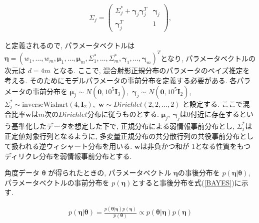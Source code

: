 \documentclass[a4j,11pt]{jarticle}
\begin{document}
\vspace{-2zh}
\begin{eqnarray}
\label{SIGMA}
 \Sigma_j = \left(
    \begin{array}{cc}
      \Sigma^*_j + \bm \gamma_j \bm \gamma_j^T & \bm \gamma_j \\
      \bm \gamma_j^T & 1
    \end{array}
  \right),
\end{eqnarray}

\vspace{-0.5zh}
\noindent
と定義されるので, パラメータベクトルは$\bm \eta = (w_1, \dots, w_m, \bm \mu_1, \dots, \bm \mu_m, \Sigma^*_1, \dots, \Sigma^*_m, \bm \gamma_1, \dots, \bm \gamma_m)^T$となり, パラメータベクトルの次元は $d = 4m$ となる. ここで, 混合射影正規分布のパラメータのベイズ推定を考える. そのためにモデルパラメータの事前分布を定義する必要がある. 各パラメータの事前分布を $\bm \mu_j \sim N(\bm 0, 10^5 \bm I_3)$,\ $\bm \gamma_j \sim  N(\bm 0, 10^5 \bm I_2)$,\ $\Sigma^*_j \sim \mathrm{inverse Wishart}(4,\bm I_2)$,\ $\bm w \sim Dirichlet(2,2, \dots, 2)$ と設定する. ここで混合比率$\bm w$は$m$次の$Dirichlet$分布に従うものとする. $\bm \mu_j,\ \bm \gamma_j$は$0$付近に存在するという基準化したデータを想定した下で, 正規分布による弱情報事前分布とし, $\Sigma^*_j$は正定値対象行列となるように, 多変量正規分布の共分散行列の共役事前分布として扱われる逆ウィシャート分布を用いる. $\bm w$は非負かつ和が $1$となる性質をもつディリクレ分布を弱情報事前分布とする.

角度データ $\bm \theta$ が得られたときの, パラメータベクトル $\bm \eta$の事後分布を $p(\bm \eta| \bm \theta)$, パラメータベクトルの事前分布を $p(\bm \eta)$とすると事後分布を式(\ref{BAYES})に示す. 

\vspace{-1zh}
\begin{eqnarray}
\label{BAYES}
p(\bm \eta | \bm \theta) = \frac{p(\bm \theta | \bm \eta) p(\bm \eta)}{p(\bm \theta)} \propto p(\bm \theta | \bm \eta) p(\bm \eta)
\end{eqnarray}
\end{document}
